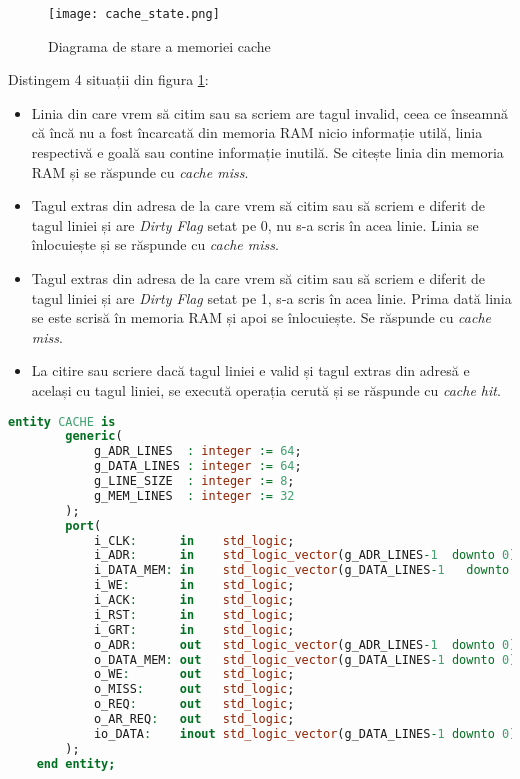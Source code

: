 \documentclass[../main.tex]{subfiles}
\begin{document}
\begin{figure}[h]
    \centering
    \texttt{[image: cache\_state.png]}
    \caption{Diagrama de stare a memoriei cache}
    \label{fig:cache_state}
\end{figure}

Distingem 4 situații din figura \ref{fig:cache_state}:
\begin{itemize}
    \item Linia din care vrem să citim sau sa scriem are tagul invalid, ceea ce înseamnă că încă nu a fost încarcată din memoria RAM
    nicio informație utilă, linia respectivă e goală sau contine informație inutilă. Se citește linia din memoria RAM și
    se răspunde cu \emph{cache miss}.
    \item Tagul extras din adresa de la care vrem să citim sau să scriem e diferit de tagul liniei și are \emph{Dirty Flag} setat pe 0,
    nu s-a scris în acea linie. Linia se înlocuiește și se răspunde cu \emph{cache miss}.
    \item Tagul extras din adresa de la care vrem să citim sau să scriem e diferit de tagul liniei și are \emph{Dirty Flag} setat pe 1,
    s-a scris în acea linie. Prima dată linia se este scrisă în memoria RAM și apoi se înlocuiește. Se răspunde cu \emph{cache miss}.
    \item La citire sau scriere dacă tagul liniei e valid și tagul extras din adresă e același cu tagul liniei, se execută
    operația cerută și se răspunde cu \emph{cache hit}. 
\end{itemize}

\begin{lstlisting}[language=VHDL, caption={Entitatea memoriei cache}, label={lst:cache}]
    entity CACHE is
        generic(
            g_ADR_LINES  : integer := 64;
            g_DATA_LINES : integer := 64;
            g_LINE_SIZE  : integer := 8;
            g_MEM_LINES  : integer := 32
        );
        port(
            i_CLK:      in    std_logic;
            i_ADR:      in    std_logic_vector(g_ADR_LINES-1  downto 0);
            i_DATA_MEM: in    std_logic_vector(g_DATA_LINES-1	downto 0);
            i_WE:       in    std_logic;
            i_ACK:      in    std_logic;
            i_RST:      in    std_logic;
            i_GRT:      in    std_logic;
            o_ADR:      out   std_logic_vector(g_ADR_LINES-1  downto 0); 
            o_DATA_MEM: out   std_logic_vector(g_DATA_LINES-1 downto 0);
            o_WE:       out   std_logic;
            o_MISS:     out   std_logic;
            o_REQ:      out	  std_logic;
            o_AR_REQ:   out   std_logic;
            io_DATA:    inout std_logic_vector(g_DATA_LINES-1 downto 0)
        );
    end entity;
    \end{lstlisting}
\end{document}

